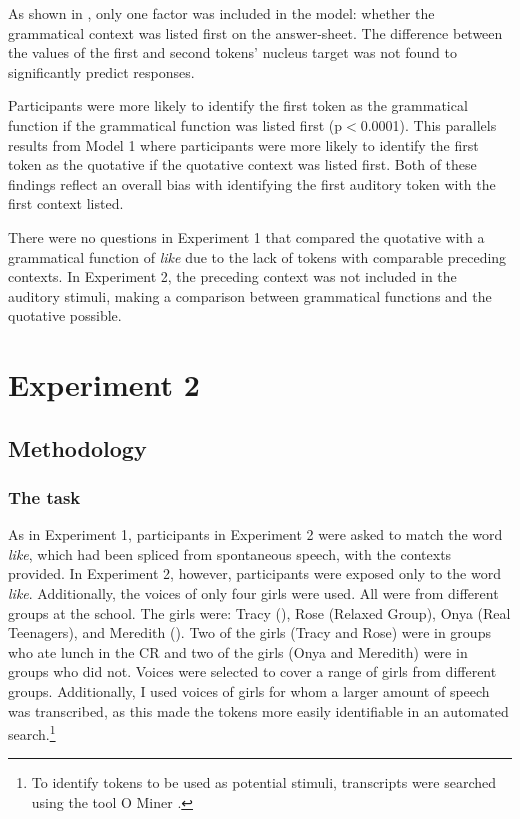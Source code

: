 As shown in , only one factor was included in the model: whether the grammatical context was listed first on the answer-sheet. The difference between the  values of the first and second tokens' nucleus target was not found to significantly predict responses.

Participants were more likely to identify the first token as the grammatical function if the grammatical function was listed first (p$<$0.0001). This parallels results from Model 1 where participants were more likely to identify the first token as the quotative if the quotative context was listed first. Both of these findings reflect an overall bias with identifying the first auditory token with the first context listed. 


There were no questions in Experiment 1 that compared the quotative with a grammatical function of \textit{like} due to the lack of tokens with comparable preceding contexts. In Experiment 2, the preceding context was not included in the auditory stimuli, making a comparison between grammatical functions and the quotative possible.




\section{Experiment 2} 

\subsection{Methodology}

\subsubsection{The task} 

As in Experiment 1, participants in Experiment 2 were asked to match the word \textit{like}, which had been spliced from spontaneous speech, with the contexts provided. In Experiment 2, however, participants were exposed only to the word \textit{like}. Additionally, the voices of only four girls were used. All were from different groups at the school. The girls were: Tracy (), Rose (Relaxed Group), Onya (Real Teenagers), and Meredith (). Two of the girls (Tracy and Rose) were in groups who ate lunch in the CR and two of the girls (Onya and Meredith) were in groups who did not. Voices were selected to cover a range of girls from different groups. Additionally, I used voices of girls for whom a larger amount of speech was transcribed, as this made the tokens more easily identifiable in an automated search.\footnote{To identify tokens to be used as potential stimuli, transcripts were searched using the tool O Miner \citep{onzeminer}.} 

